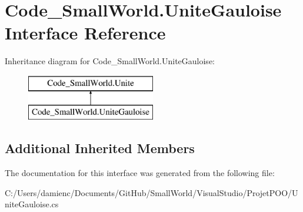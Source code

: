 \hypertarget{interface_code___small_world_1_1_unite_gauloise}{\section{Code\-\_\-\-Small\-World.\-Unite\-Gauloise Interface Reference}
\label{interface_code___small_world_1_1_unite_gauloise}
}
Inheritance diagram for Code\-\_\-\-Small\-World.\-Unite\-Gauloise\-:\begin{figure}[H]
\begin{center}
\leavevmode
\includegraphics[height=2.000000cm]{interface_code___small_world_1_1_unite_gauloise}
\end{center}
\end{figure}
\subsection*{Additional Inherited Members}


The documentation for this interface was generated from the following file\-:\begin{DoxyCompactItemize}
\item 
C\-:/\-Users/damienc/\-Documents/\-Git\-Hub/\-Small\-World/\-Visual\-Studio/\-Projet\-P\-O\-O/Unite\-Gauloise.\-cs\end{DoxyCompactItemize}

